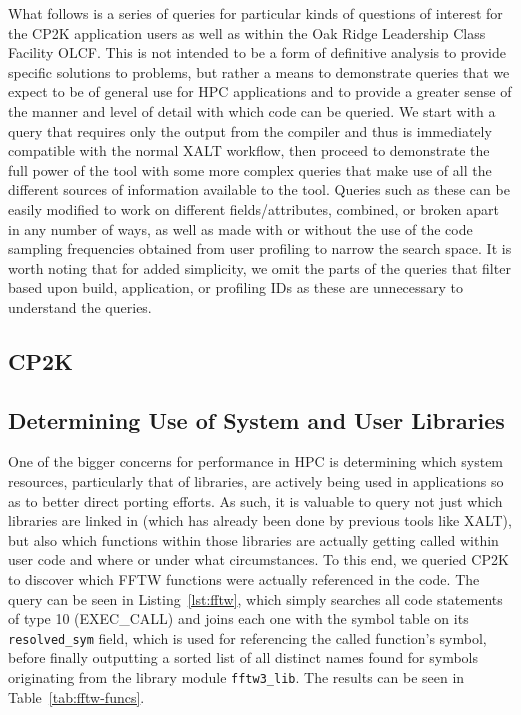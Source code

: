 What follows is a series of queries for particular kinds of questions of interest for the CP2K 
application users as well as within the Oak Ridge Leadership Class Facility \acs{OLCF}.
This is not intended to be a form of definitive analysis to provide specific solutions to problems, but 
rather a means to demonstrate queries that we expect to be of general use for \acs{HPC} 
applications and to provide a greater sense of the manner and level of detail with which code can be 
queried.
We start with a query that requires only the output from the compiler and thus is immediately 
compatible with the normal XALT workflow, then proceed to demonstrate the full power of the tool 
with some more complex queries that make use of all the different sources of information available to 
the tool.
Queries such as these can be easily modified to work on different fields/attributes, combined, or 
broken apart in any number of ways, as well as made with or without the use of the code sampling 
frequencies obtained from user profiling to narrow the search space.
It is worth noting that for added simplicity, we omit the parts of the queries that filter based upon 
build, application, or profiling IDs as these are unnecessary to understand the queries.

\subsection{CP2K}
\label{sec:cp2k}


\subsection{Determining Use of System and User Libraries}
One of the bigger concerns for performance in \acs{HPC} is determining which system resources, 
particularly that of libraries, are actively being used in applications so as to better direct porting 
efforts.
As such, it is valuable to query not just which libraries are linked in (which has already been done by 
previous tools like XALT), but also which functions within those libraries are actually getting called 
within user code and where or under what circumstances.
To this end, we queried CP2K to discover which \ac{FFTW} functions were actually referenced in the 
code.
The query can be seen in Listing~\ref{lst:fftw}, which simply searches all code statements of type 10 
(EXEC\_CALL) and joins each one with the symbol table on its \texttt{resolved\_sym} field, which is 
used for referencing the called function's symbol, before finally outputting a sorted list of all distinct 
names found for symbols originating from the library module \texttt{fftw3\_lib}.
The results can be seen in Table~\ref{tab:fftw-funcs}.


